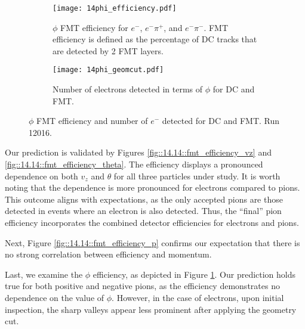     \begin{figure}
        \begin{subfigure}[b]{\textwidth}
            \texttt{[image: 14phi\_efficiency.pdf]}
            \caption{$\phi$ FMT efficiency for $e^-$, $e^-\pi^+$, and $e^-\pi^-$.
            FMT efficiency is defined as the percentage of DC tracks that are detected by 2 FMT layers.}
            \label{fig::14.14::fmt_efficiency_phi}
        \end{subfigure}
        \begin{subfigure}[b]{\textwidth}
            \texttt{[image: 14phi\_geomcut.pdf]}
            \caption{Number of electrons detected in terms of $\phi$ for DC and FMT.}
            \label{fig::14.14::phi_geomcut}
        \end{subfigure}

        \caption[$\phi$ efficiency and geometry cut study, run 12016]
        {$\phi$ FMT efficiency and number of $e^-$ detected for DC and FMT.
        Run 12016.}
        \label{fig::14.14::phi_study}
    \end{figure}

    Our prediction is validated by Figures \ref{fig::14.14::fmt_efficiency_vz} and \ref{fig::14.14::fmt_efficiency_theta}.
    The efficiency displays a pronounced dependence on both $v_z$ and $\theta$ for all three particles under study.
    It is worth noting that the dependence is more pronounced for electrons compared to pions.
    This outcome aligns with expectations, as the only accepted pions are those detected in events where an electron is also detected.
    Thus, the ``final'' pion efficiency incorporates the combined detector efficiencies for electrons and pions.

    Next, Figure \ref{fig::14.14::fmt_efficiency_p} confirms our expectation that there is no strong correlation between efficiency and momentum.

    Last, we examine the $\phi$ efficiency, as depicted in Figure \ref{fig::14.14::fmt_efficiency_phi}.
    Our prediction holds true for both positive and negative pions, as the efficiency demonstrates no dependence on the value of $\phi$.
    However, in the case of electrons, upon initial inspection, the sharp valleys appear less prominent after applying the geometry cut.

